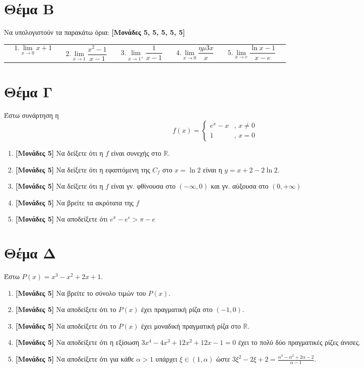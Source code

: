\documentclass[12pt]{article}
\begin{document}
\section*{Θέμα Β}
  \noindent

Να υπολογιστούν τα παρακάτω όρια: \textbf{[Μονάδες 5, 5, 5, 5, 5]}
  \begin{table}[ht]
    \begin{tabularx}{\textwidth}{ X p{6em} X p{6em} X p{6em} X p{6em} X p{6em} X }
      & $$1. \lim_{x \to 0} x+1 $$ & & $$2. \lim_{x \to 1} \frac{x^2-1}{x-1} $$ & & $$3. \lim_{x \to 1^{+}} \frac{1}{x-1} $$ & & $$4. \lim_{x \to 0} \frac{ημ3x}{x} $$ & & $$5. \lim_{x \to e} \frac{\ln x-1}{x-e} $$ &
    \end{tabularx}
  \end{table}

\section*{Θέμα Γ}
  \noindent

  Έστω συνάρτηση η $$f(x)=\begin{cases} e^x-x & \text{, } x \ne 0 \\ 1 & \text{, } x = 0  \end{cases}$$
  \begin{enumerate}
    \item \textbf{[Μονάδες 5]}  Να δείξετε ότι η $f$ είναι συνεχής στο $\mathbb{R}$.
    \item \textbf{[Μονάδες 5]}  Να δείξετε ότι η εφαπτόμενη της $C_f$ στο $x=\ln2$ είναι η $y=x+2-2\ln2$.
    \item \textbf{[Μονάδες 5]}  Να δείξετε ότι η $f$ είναι γν. φθίνουσα στο $\left(-\infty,0\right)$ και γν. αύξουσα στο $\left(0,+\infty\right)$
    \item \textbf{[Μονάδες 5]}  Να βρείτε τα ακρότατα της $f$
    \item \textbf{[Μονάδες 5]}  Να αποδείξετε ότι $e^{\pi}-e^e > \pi-e$
  \end{enumerate}

\section*{Θέμα Δ}
  \noindent

  Έστω $P(x)=x^3-x^2+2x+1$.

  \begin{enumerate}
    \item \textbf{[Μονάδες 5]}  Να βρείτε το σύνολο τιμών του $P(x)$.
    \item \textbf{[Μονάδες 5]}  Να αποδείξετε ότι το $P(x)$ έχει πραγματική ρίζα στο $(-1,0)$.
    \item \textbf{[Μονάδες 5]}  Να αποδείξετε ότι το $P(x)$ έχει μοναδική πραγματική ρίζα στο $\mathbb{R}$.
    \item \textbf{[Μονάδες 5]}  Να αποδείξετε ότι η εξίσωση $3x^4-4x^3+12x^2+12x-1=0$ έχει το πολύ δύο πραγματικές ρίζες άνισες.
    \item \textbf{[Μονάδες 5]}  Να αποδείξετε ότι για κάθε $α>1$ υπάρχει $ξ\in (1,α)$ ώστε $3ξ^2-2ξ+2=\frac{α^3-α^2+2α-2}{α-1}$.
  \end{enumerate}
\end{document}
